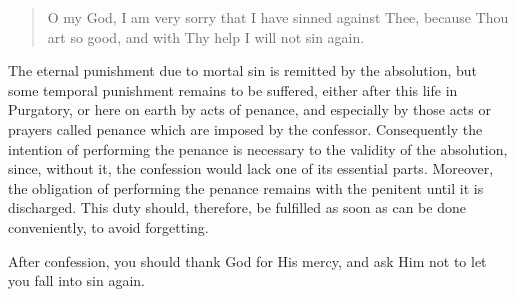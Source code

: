 
\begin{quote}

O my God, I am very sorry that I have sinned against Thee, because Thou art so good, and with Thy help I will not sin again.

\end{quote}


The eternal punishment due to mortal sin is remitted by the absolution, but some temporal punishment remains to be suffered, either after this life in Purgatory, or here on earth by acts of penance, and especially by those acts or prayers called penance which are imposed by the confessor. Consequently the intention of performing the penance is necessary to the validity of the absolution, since, without it, the confession would lack one of its essential parts. Moreover, the obligation of performing the penance remains with the penitent until it is discharged. This duty should, therefore, be fulfilled as soon as can be done conveniently, to avoid forgetting.

\bigskip


After confession, you should thank God for His mercy, and ask Him not to let you fall into sin again.




